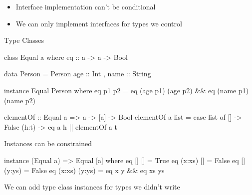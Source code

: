 \documentclass[usenames,dvipsnames,svgnames,table,aspectratio=169,mathserif]{beamer}
\newcommand{\nl}{\vspace{\baselineskip}}
\newcommand{\pnl}{\pause \nl}
\begin{document}
\begin{frame}
\begin{itemize}
\item Interface implementation can't be conditional
\item We can only implement interfaces for types we control
\end{itemize}

\end{frame}




\begin{frame}
\begin{center}
\huge{Type Classes}
\end{center}
\end{frame}


\begin{frame}[fragile]
\begin{haskellcode}
class Equal a where
  eq :: a -> a -> Bool
\end{haskellcode}

\pnl

\begin{haskellcode}
data Person = Person {
  age :: Int
, name :: String
}
\end{haskellcode}

\pnl

\begin{haskellcode}
instance Equal Person where
  eq p1 p2 = eq (age p1) (age p2) && eq (name p1) (name p2)
\end{haskellcode}

\end{frame}


\begin{frame}[fragile]
\begin{haskellcode}
elementOf :: Equal a => a -> [a] -> Bool
elementOf a list =
  case list of
    []    -> False
    (h:t) -> eq a h || elementOf a t
\end{haskellcode}
\end{frame}


\begin{frame}[fragile]
Instances can be constrained

\nl


\begin{haskellcode}
instance (Equal a) => Equal [a] where
  eq []     []     = True
  eq (x:xs) []     = False
  eq []     (y:ys) = False
  eq (x:xs) (y:ys) = eq x y && eq xs ys
\end{haskellcode}

\pnl

We can add type class instances for types we didn't write
\end{frame}
\end{document}
